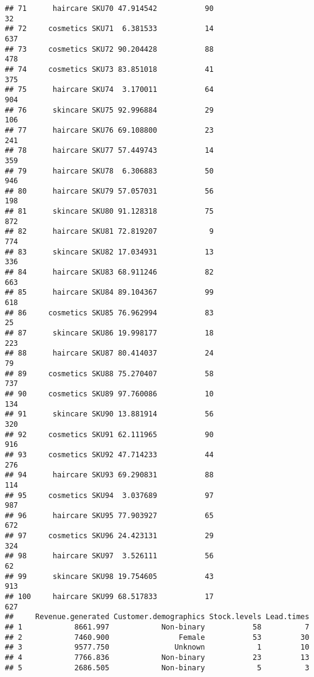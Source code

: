 \documentclass[
]{article}
\begin{document}
\begin{verbatim}
## 71      haircare SKU70 47.914542           90                      32
## 72     cosmetics SKU71  6.381533           14                     637
## 73     cosmetics SKU72 90.204428           88                     478
## 74     cosmetics SKU73 83.851018           41                     375
## 75      haircare SKU74  3.170011           64                     904
## 76      skincare SKU75 92.996884           29                     106
## 77      haircare SKU76 69.108800           23                     241
## 78      haircare SKU77 57.449743           14                     359
## 79      haircare SKU78  6.306883           50                     946
## 80      haircare SKU79 57.057031           56                     198
## 81      skincare SKU80 91.128318           75                     872
## 82      haircare SKU81 72.819207            9                     774
## 83      skincare SKU82 17.034931           13                     336
## 84      haircare SKU83 68.911246           82                     663
## 85      haircare SKU84 89.104367           99                     618
## 86     cosmetics SKU85 76.962994           83                      25
## 87      skincare SKU86 19.998177           18                     223
## 88      haircare SKU87 80.414037           24                      79
## 89     cosmetics SKU88 75.270407           58                     737
## 90     cosmetics SKU89 97.760086           10                     134
## 91      skincare SKU90 13.881914           56                     320
## 92     cosmetics SKU91 62.111965           90                     916
## 93     cosmetics SKU92 47.714233           44                     276
## 94      haircare SKU93 69.290831           88                     114
## 95     cosmetics SKU94  3.037689           97                     987
## 96      haircare SKU95 77.903927           65                     672
## 97     cosmetics SKU96 24.423131           29                     324
## 98      haircare SKU97  3.526111           56                      62
## 99      skincare SKU98 19.754605           43                     913
## 100     haircare SKU99 68.517833           17                     627
##     Revenue.generated Customer.demographics Stock.levels Lead.times
## 1            8661.997            Non-binary           58          7
## 2            7460.900                Female           53         30
## 3            9577.750               Unknown            1         10
## 4            7766.836            Non-binary           23         13
## 5            2686.505            Non-binary            5          3

\end{verbatim}
\end{document}
